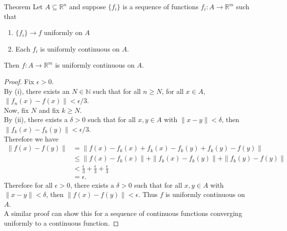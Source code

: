 \begin{flushleft}
    \begin{namedthm*}{Theorem}
        Let $A\subseteq\mathbb{R}^n$ and suppose $\{f_i\}$ is a sequence of functions $f_i:A\to\mathbb{R}^m$ such that 
        \begin{enumerate}[label=(\roman*),align=left]
            \item $\{f_i\}\to f$ uniformly on $A$
            \item Each $f_i$ is uniformly continuous on $A$.
        \end{enumerate}
        Then $f:A\to\mathbb{R}^m$ is uniformly continuous on $A$.
    \end{namedthm*}
    \begin{proof}
        Fix $\epsilon>0$.\\
        By (i), there exists an $N\in\mathbb{N}$ such that for all $n\ge N$, for all $x\in A$, $\|f_n(x)-f(x)\|<\epsilon/3$.
        \\Now, fix $N$ and fix $k\ge N$.\\
        By (ii), there exists a $\delta>0$ such that for all $x,y\in A$ with $\|x-y\|<\delta$, then $\|f_k(x)-f_k(y)\|<\epsilon/3$.
        \\Therefore we have
        \begin{align*}
            \|f(x)-f(y)\|&=\|f(x)-f_k(x)+f_k(x)-f_k(y)+f_k(y)-f(y)\|\\
            &\le\|f(x)-f_k(x)\|+\|f_k(x)-f_k(y)\|+\|f_k(y)-f(y)\|\\
            &<\frac{\epsilon}{3}+\frac{\epsilon}{3}+\frac{\epsilon}{3}\\
            &=\epsilon.
        \end{align*}
        Therefore for all $\epsilon>0$, there exists a $\delta>0$ such that for all $x,y \in A$ with $\|x-y\|<\delta$, then $\|f(x)-f(y)\|<\epsilon$.
        Thus $f$ is uniformly continuous on $A$.\\
        A similar proof can show this for a sequence of continuous functions converging uniformly to a continuous function.
    \end{proof}


\end{flushleft}
